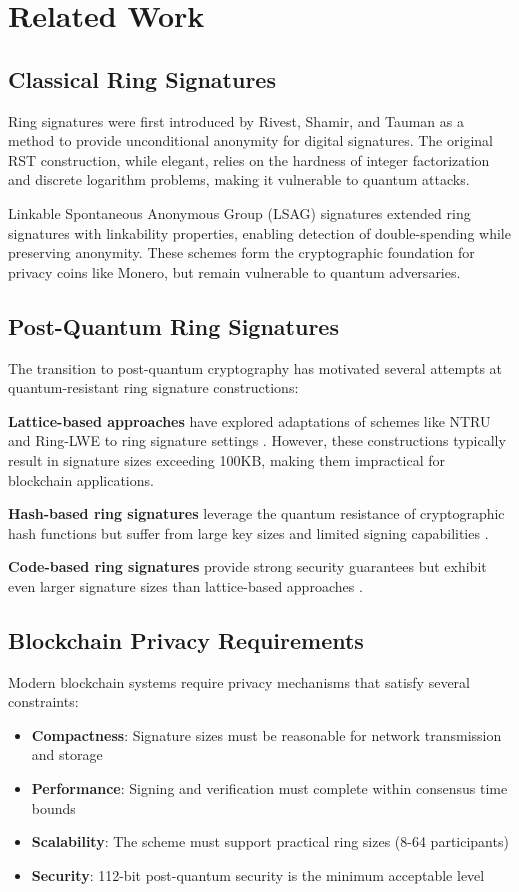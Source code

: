 \documentclass[11pt,a4paper]{article}
\begin{document}
\section{Related Work}

\subsection{Classical Ring Signatures}

Ring signatures were first introduced by Rivest, Shamir, and Tauman \cite{rst01} as a method to provide unconditional anonymity for digital signatures. The original RST construction, while elegant, relies on the hardness of integer factorization and discrete logarithm problems, making it vulnerable to quantum attacks.

Linkable Spontaneous Anonymous Group (LSAG) signatures \cite{lsag04} extended ring signatures with linkability properties, enabling detection of double-spending while preserving anonymity. These schemes form the cryptographic foundation for privacy coins like Monero, but remain vulnerable to quantum adversaries.

\subsection{Post-Quantum Ring Signatures}

The transition to post-quantum cryptography has motivated several attempts at quantum-resistant ring signature constructions:

\textbf{Lattice-based approaches} have explored adaptations of schemes like NTRU and Ring-LWE to ring signature settings \cite{lattice-rings}. However, these constructions typically result in signature sizes exceeding 100KB, making them impractical for blockchain applications.

\textbf{Hash-based ring signatures} leverage the quantum resistance of cryptographic hash functions but suffer from large key sizes and limited signing capabilities \cite{hash-rings}.

\textbf{Code-based ring signatures} provide strong security guarantees but exhibit even larger signature sizes than lattice-based approaches \cite{code-rings}.

\subsection{Blockchain Privacy Requirements}

Modern blockchain systems require privacy mechanisms that satisfy several constraints:
\begin{itemize}
\item \textbf{Compactness}: Signature sizes must be reasonable for network transmission and storage
\item \textbf{Performance}: Signing and verification must complete within consensus time bounds
\item \textbf{Scalability}: The scheme must support practical ring sizes (8-64 participants)
\item \textbf{Security}: 112-bit post-quantum security is the minimum acceptable level
\end{itemize}
\end{document}

